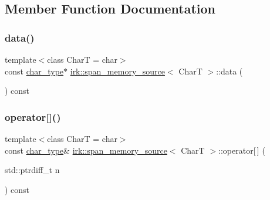 \subsection{Member Function Documentation}
\mbox{\label{classirk_1_1span__memory__source_a117f7439cc35e16c02b3656104020ad3}} 
\subsubsection{\texorpdfstring{data()}{data()}}
{\footnotesize\ttfamily template$<$class CharT  = char$>$ \\
const \mbox{\hyperlink{classirk_1_1span__memory__source_a769d88b11f7c2882a006e93edb2cdb79}{char\+\_\+type}}$\ast$ \mbox{\hyperlink{classirk_1_1span__memory__source}{irk\+::span\+\_\+memory\+\_\+source}}$<$ CharT $>$\+::data (\begin{DoxyParamCaption}{ }\end{DoxyParamCaption}) const\hspace{0.3cm}{\ttfamily [inline]}}

\mbox{\label{classirk_1_1span__memory__source_ab3e7c421404d5790d79b74e142cedb52}} 
\subsubsection{\texorpdfstring{operator[]()}{operator[]()}}
{\footnotesize\ttfamily template$<$class CharT  = char$>$ \\
const \mbox{\hyperlink{classirk_1_1span__memory__source_a769d88b11f7c2882a006e93edb2cdb79}{char\+\_\+type}}\& \mbox{\hyperlink{classirk_1_1span__memory__source}{irk\+::span\+\_\+memory\+\_\+source}}$<$ CharT $>$\+::operator\mbox{[}$\,$\mbox{]} (\begin{DoxyParamCaption}\item[{std\+::ptrdiff\+\_\+t}]{n }\end{DoxyParamCaption}) const\hspace{0.3cm}{\ttfamily [inline]}}

